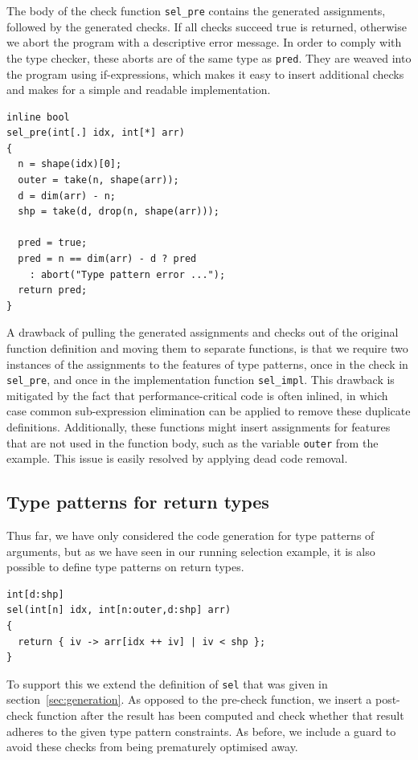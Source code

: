 \documentclass[sigconf,screen]{acmart}
\begin{document}
The body of the check function \texttt{sel\_pre} contains the generated assignments, followed by the generated checks.
If all checks succeed true is returned, otherwise we abort the program with a descriptive error message.
In order to comply with the type checker, these aborts are of the same type as \texttt{pred}.
They are weaved into the program using if-expressions, which makes it easy to insert additional checks and makes for a simple and readable implementation.

\begin{lstlisting}
inline bool
sel_pre(int[.] idx, int[*] arr)
{
  n = shape(idx)[0];
  outer = take(n, shape(arr));
  d = dim(arr) - n;
  shp = take(d, drop(n, shape(arr)));

  pred = true;
  pred = n == dim(arr) - d ? pred
    : abort("Type pattern error ...");
  return pred;
}
\end{lstlisting}

A drawback of pulling the generated assignments and checks out of the original function definition and moving them to separate functions, is that we require two instances of the assignments to the features of type patterns, once in the check in \texttt{sel\_pre}, and once in the implementation function \texttt{sel\_impl}.
This drawback is mitigated by the fact that performance-critical code is often inlined, in which case common sub-expression elimination can be applied to remove these duplicate definitions.
Additionally, these functions might insert assignments for features that are not used in the function body, such as the variable \texttt{outer} from the example.
This issue is easily resolved by applying dead code removal.

\subsection{Type patterns for return types}
Thus far, we have only considered the code generation for type patterns of arguments, but as we have seen in our running selection example, it is also possible to define type patterns on return types.

\begin{lstlisting}
int[d:shp]
sel(int[n] idx, int[n:outer,d:shp] arr)
{
  return { iv -> arr[idx ++ iv] | iv < shp };
}
\end{lstlisting}

To support this we extend the definition of \texttt{sel} that was given in section~\ref{sec:generation}.
As opposed to the pre-check function, we insert a post-check function after the result has been computed and check whether that result adheres to the given type pattern constraints.
As before, we include a guard to avoid these checks from being prematurely optimised away.
\end{document}
